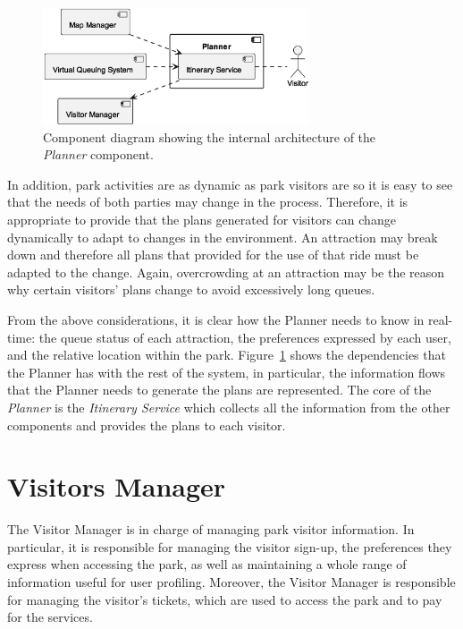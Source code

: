 \begin{figure}[H]
	\centering
	\includegraphics[width=0.7\textwidth]{img/planner.eps}
	\caption{Component diagram showing the internal architecture of the \textit{Planner} component.}
	\label{fig:planner-arch}
\end{figure}

In addition, park activities are as dynamic as park visitors are so it is easy to see that the needs of both parties may change in the process.
Therefore, it is appropriate to provide that the plans generated for visitors can change dynamically to adapt to changes in the environment. An
attraction may break down and therefore all plans that provided for the use of that ride must be adapted to the change. Again, overcrowding at an
attraction may be the reason why certain visitors' plans change to avoid excessively long queues.

From the above considerations, it is clear how the Planner needs to know in real-time: the queue status of each attraction, the preferences expressed
by each user, and the relative location within the park. Figure~\ref{fig:planner-arch} shows the dependencies that the Planner has with the rest of
the system, in particular, the information flows that the Planner needs to generate the plans are represented. The core of the \textit{Planner} is
the \textit{Itinerary Service} which collects all the information from the other components and provides the plans to each visitor.

\section{Visitors Manager}

The Visitor Manager is in charge of managing park visitor information. In particular, it is responsible for managing the visitor sign-up, the
preferences they express when accessing the park, as well as maintaining a whole range of information useful for user profiling. Moreover, the
Visitor Manager is responsible for managing the visitor's tickets, which are used to access the park and to pay for the services.

